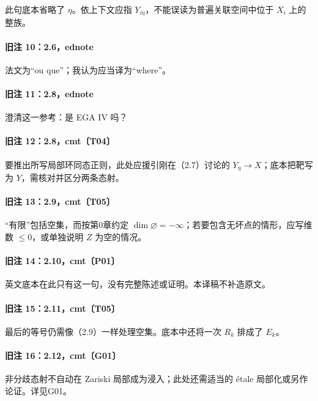 此句底本省略了 $\eta$。依上下文应指 $Y_{i\eta}$，不能误读为普遍关联空间中位于 $X_i$ 上的整族。

\paragraph{旧注 10：2.6，ednote}

法文为“ou que”；我认为应当译为“where”。

\paragraph{旧注 11：2.8，ednote}

澄清这一参考：是 EGA IV 吗？

\paragraph{旧注 12：2.8，cmt〔T04〕}

要推出所写局部环同态正则，此处应援引刚在（2.7）讨论的 $Y_\eta\to X$；底本把靶写为 $Y$，需核对并区分两条态射。

\paragraph{旧注 13：2.9，cmt〔T05〕}

“有限”包括空集，而按第0章约定 $\dim\varnothing=-\infty$；若要包含无坏点的情形，应写维数 $\leq0$，或单独说明 $Z$ 为空的情况。

\paragraph{旧注 14：2.10，cmt〔P01〕}

英文底本在此只有这一句，没有完整陈述或证明。本译稿不补造原文。

\paragraph{旧注 15：2.11，cmt〔T05〕}

最后的等号仍需像（2.9）一样处理空集。底本中还将一次 $R_k$ 排成了 $E_k$。

\paragraph{旧注 16：2.12，cmt〔G01〕}

非分歧态射不自动在 Zariski 局部成为浸入；此处还需适当的 étale 局部化或另作论证。详见G01。

